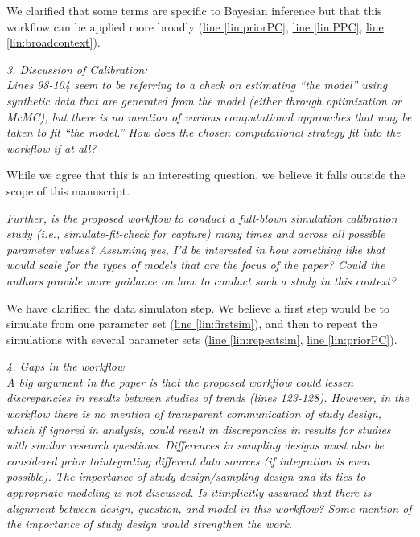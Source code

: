 \documentclass[11pt,letter]{article}
\begin{document}
We clarified that some terms are specific to Bayesian inference but that this workflow can be applied more broadly (\href{file:forecastflows_r1\#lintarget:priorPC}{line \ref*{lin:priorPC}}, \href{file:forecastflows_r1\#lintarget:PPC}{line \ref*{lin:PPC}}, \href{file:forecastflows_r1\#lintarget:broadcontext}{line \ref*{lin:broadcontext}}).

\begin{mybox}
\emph{3. Discussion of Calibration:\\
Lines 98-104 seem to be referring to a check on estimating “the model” using synthetic data that are generated from the model (either through optimization or McMC), but there is no mention of various computational approaches that may be taken to fit “the model.” How does the chosen computational strategy fit into the workflow if at all?}
\end{mybox}

While we agree that this is an interesting question, we believe it falls outside the scope of this manuscript.

\begin{mybox}
\emph{Further, is the proposed workflow to conduct a full-blown simulation calibration study (i.e., simulate-fit-check for capture) many times and across all possible parameter values? Assuming yes, I’d be interested in how something like that would scale for the types of models that are the focus of the paper? Could the authors provide more guidance on how to conduct such a study in this context?}
\end{mybox}

We have clarified the data simulaton step. We believe a first step would be to simulate from one parameter set (\href{file:forecastflows_r1\#lintarget:firstsim}{line \ref*{lin:firstsim}}), and then to repeat the simulations with several parameter sets (\href{file:forecastflows_r1\#lintarget:repeatsim}{line \ref*{lin:repeatsim}}, \href{file:forecastflows_r1\#lintarget:priorPC}{line \ref*{lin:priorPC}}).

\begin{mybox}
\emph{4. Gaps in the workflow\\
A big argument in the paper is that the proposed workflow could lessen discrepancies in results between studies of trends (lines 123-128). However, in the workflow there is no mention of transparent communication of study design, which if ignored in analysis, could result in discrepancies in results for studies with similar research questions. Differences in sampling designs must also be considered prior tointegrating different data sources (if integration is even possible). The importance of study design/sampling design and its ties to appropriate modeling is not discussed. Is itimplicitly assumed that there is alignment between design, question, and model in this workflow? Some mention of the importance of study design would strengthen the work.}
\end{mybox}
\end{document}
